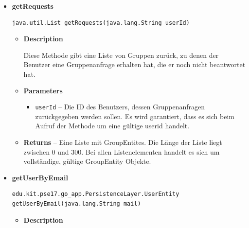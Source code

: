 \documentclass[11pt,a4paper]{report}
\begin{document}
{{{{{{{{{{{{\begin{itemize}
{\begin{itemize}
{Diese Methode gibt eine Liste mit allen Gruppen zurück, in denen der Benutzer Mitglied ist. Dies schließt Gruppen nicht mit ein, zu denen der Benutzer eingeladen wurde, er die Gruppenanfrage aber noch nicht beantwortet hat.
}
\item{
{\bf  Parameters}
  \begin{itemize}
   \item{
\texttt{userId} -- Die ID des Benutzers, dessen Gruppen zurückgegeben werden sollen. Es wird garantiert, dass es sich beim Aufruf der Methode um eine gültige userid handelt.}
  \end{itemize}
}%
\item{{\bf  Returns} -- 
Eine Liste mit GroupEntites. Die Länge der Liste liegt zwischen 0 und 300. Bei allen Listenelementen handelt es sich um vollständige, gültige GroupEntity Objekte. 
}%
\end{itemize}
}%
\item{ 
\hypertarget{edu.kit.pse17.go_app.PersistenceLayer.daos.UserDao.getRequests(java.lang.String)}{{\bf  getRequests}\\}
\begin{lstlisting}[frame=none]
java.util.List getRequests(java.lang.String userId)\end{lstlisting} %
\begin{itemize}
\item{
{\bf  Description}

Diese Methode gibt eine Liste von Gruppen zurück, zu denen der Benutzer eine Gruppenanfrage erhalten hat, die er noch nicht beantwortet hat.
}
\item{
{\bf  Parameters}
  \begin{itemize}
   \item{
\texttt{userId} -- Die ID des Benutzers, dessen Gruppenanfragen zurückgegeben werden sollen. Es wird garantiert, dass es sich beim Aufruf der Methode um eine gültige userid handelt.}
  \end{itemize}
}%
\item{{\bf  Returns} -- 
Eine Liste mit GroupEntites. Die Länge der Liste liegt zwischen 0 und 300. Bei allen Listenelementen handelt es sich um vollständige, gültige GroupEntity Objekte. 
}%
\end{itemize}
}%
\item{ 
\hypertarget{edu.kit.pse17.go_app.PersistenceLayer.daos.UserDao.getUserByEmail(java.lang.String)}{{\bf  getUserByEmail}\\}
\begin{lstlisting}[frame=none]
edu.kit.pse17.go_app.PersistenceLayer.UserEntity getUserByEmail(java.lang.String mail)\end{lstlisting} %
\begin{itemize}
\item{
{\bf  Description}

}
\end{itemize}}
\end{itemize}}}}}}}}}}}}}
\end{document}
